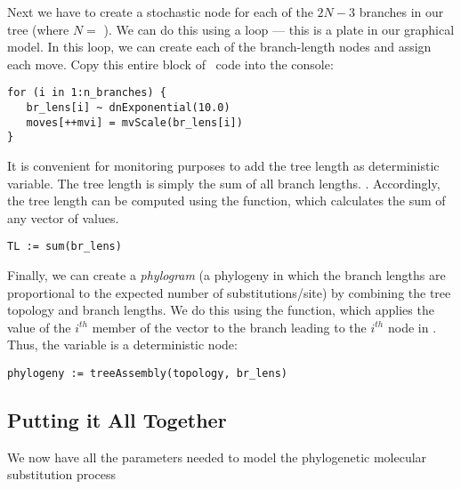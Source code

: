 Next we have to create a stochastic node for each of the $2N-3$ branches in our tree (where $N=$ ). 
We can do this using a  loop --- this is a plate in our graphical model. In this loop, we can create each of the branch-length nodes and assign each move. 
Copy this entire block of \Rev~code into the console:
{\tt \small \begin{snugshade*}
\begin{lstlisting}
for (i in 1:n_branches) {
   br_lens[i] ~ dnExponential(10.0)
   moves[++mvi] = mvScale(br_lens[i]) 
}
\end{lstlisting}
\end{snugshade*}}

It is convenient for monitoring purposes to add the tree length as deterministic variable. 
The tree length is simply the sum of all branch lengths. .
Accordingly, the tree length can be computed using the  function, which calculates the sum of any vector of values.
{\tt \begin{snugshade*}
\begin{lstlisting}
TL := sum(br_lens)
\end{lstlisting}
\end{snugshade*}}


Finally, we can create a \emph{phylogram} (a phylogeny in which the branch lengths are proportional to the expected number of substitutions/site) by combining the tree topology and branch lengths.
We do this using the  function, which applies the value of the $i^{th}$ member of the  vector to the branch leading to the $i^{th}$ node in . 
Thus, the  variable is a deterministic node: 
{\tt \begin{snugshade*}
\begin{lstlisting}
phylogeny := treeAssembly(topology, br_lens)
\end{lstlisting}
\end{snugshade*}}



\subsection{Putting it All Together}

We now have all the parameters needed to model the phylogenetic molecular substitution process

